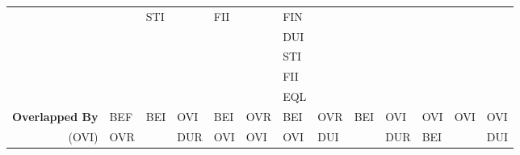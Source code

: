 \documentclass[11pt]{report}
\newenvironment{vvarmargin}[2]
{
  \begin{list}{}
  {
    \setlength{\topsep}{0pt}
    \setlength{\leftmargin}{0pt}
    \setlength{\rightmargin}{0pt}
    \setlength{\listparindent}{\parindent}
    \setlength{\itemindent}{\parindent}
    \setlength{\parsep}{0pt plus 1pt}
    \addtolength{\leftmargin}{#1}\addtolength{\rightmargin}{#2}
  }
  \item
}
{
  \end{list}
}
\begin{document}
\begin{table}[p]
\begin{vvarmargin}{-4cm}{-4cm}
\begin{center}
\begin{tabular}[t]{|r|l|l|l|l|l|l|l|l|l|l|l|l|}
                                        &                         & STI                     &                         & FII                     &                         & FIN                     &                         &                         &                         &                         &                         &                         \\
                                        &                         &                         &                         &                         &                         & DUI                     &                         &                         &                         &                         &                         &                         \\
                                        &                         &                         &                         &                         &                         & STI                     &                         &                         &                         &                         &                         &                         \\
                                        &                         &                         &                         &                         &                         & FII                     &                         &                         &                         &                         &                         &                         \\
                                        &                         &                         &                         &                         &                         & EQL                     &                         &                         &                         &                         &                         &                         \\
                \hline
                \textbf{Overlapped By}  & BEF                     & BEI                     & OVI                     & BEI                     & OVR                     & BEI                     & OVR                     & BEI                     & OVI                     & OVI                     & OVI                     & OVI                     \\
                (OVI)                   & OVR                     &                         & DUR                     & OVI                     & OVI                     & OVI                     & DUI                     &                         & DUR                     & BEI                     &                         & DUI                     \\

\end{tabular}
\end{center}
\end{vvarmargin}
\end{table}
\end{document}
